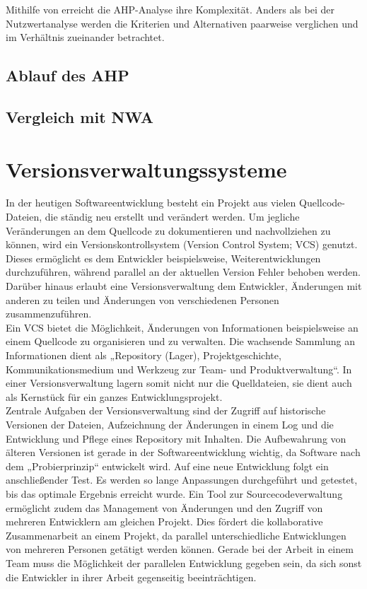 Mithilfe von erreicht die AHP-Analyse ihre Komplexität. Anders als bei der Nutzwertanalyse werden die Kriterien und Alternativen paarweise verglichen und im Verhältnis zueinander betrachtet.
\subsection{Ablauf des AHP}

\subsection{Vergleich mit NWA}
\section{Versionsverwaltungssysteme}
In der heutigen Softwareentwicklung besteht ein Projekt aus vielen Quellcode-Dateien, die ständig neu erstellt und verändert werden. Um jegliche Veränderungen an dem Quellcode zu dokumentieren und nachvollziehen zu können, wird ein Versionskontrollsystem (Version Control System; VCS) genutzt.\autocite[Vgl.][S.6]{Baerisch.2005}  
Dieses ermöglicht es dem Entwickler beispielsweise, Weiterentwicklungen durchzuführen, während parallel an der aktuellen Version Fehler behoben werden. Darüber hinaus erlaubt eine Versionsverwaltung dem Entwickler, Änderungen mit anderen zu teilen und Änderungen von verschiedenen Personen zusammenzuführen.\autocite[Vgl.][S.9]{Kleine.2012} \\
Ein VCS bietet die Möglichkeit, Änderungen von Informationen beispielsweise an einem Quellcode zu organisieren und zu verwalten. \autocite[Vgl.][S.1]{Pilato.2009}
Die wachsende Sammlung an Informationen dient als „Repository (Lager), Projektgeschichte, Kommunikationsmedium und Werkzeug zur Team- und Produktverwaltung“.\autocite[][S.1]{Loeliger.2010} In einer Versionsverwaltung lagern somit nicht nur die Quelldateien, sie dient auch als Kernstück für ein ganzes Entwicklungsprojekt. \\
Zentrale Aufgaben der Versionsverwaltung sind der Zugriff auf historische Versionen der Dateien, Aufzeichnung der Änderungen in einem Log und die Entwicklung und Pflege eines Repository mit Inhalten. Die Aufbewahrung von älteren Versionen ist gerade in der Softwareentwicklung wichtig, da Software nach dem „Probierprinzip“\autocite[][S.9]{Versteegen.2003} entwickelt wird. Auf eine neue Entwicklung folgt ein anschließender Test. Es werden so lange Anpassungen durchgeführt und getestet, bis das optimale Ergebnis erreicht wurde.\autocite[Vgl.][S.9]{Versteegen.2003}
Ein Tool zur Sourcecodeverwaltung ermöglicht zudem das Management von Änderungen und den Zugriff von mehreren Entwicklern am gleichen Projekt.\autocite[Vgl.][S.1]{Loeliger.2010} Dies fördert die kollaborative Zusammenarbeit an einem Projekt, da parallel unterschiedliche Entwicklungen von mehreren Personen getätigt werden können. Gerade bei der Arbeit in einem Team muss die Möglichkeit der parallelen Entwicklung gegeben sein, da sich sonst die Entwickler in ihrer Arbeit gegenseitig beeinträchtigen.
